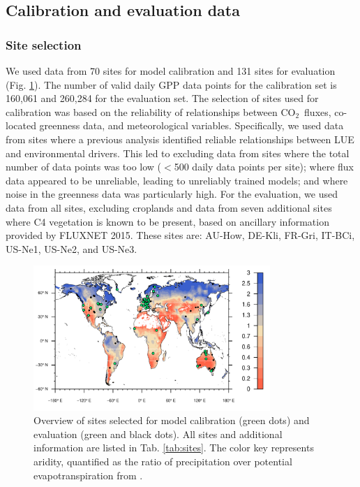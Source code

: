 \documentclass{myreport}
\newcommand{\coo}{CO$_2$}
\begin{document}
\subsection{Calibration and evaluation data}

\label{sec:calibdata}

\subsubsection{Site selection}
We used data from 70 sites for model calibration and 131 sites for evaluation (Fig. \ref{fig:map_sites}). The number of valid daily GPP data points for the calibration set is 160,061 and 260,284 for the evaluation set. The selection of sites used for calibration was based on the reliability of relationships between \coo\ fluxes, co-located greenness data, and meteorological variables. Specifically, we used data from sites where a previous analysis \citep{stocker18newphyt} identified reliable relationships between LUE and environmental drivers. This led to excluding data from sites where the total number of data points was too low ($<$500 daily data points per site); where flux data appeared to be unreliable, leading to unreliably trained models; and where noise in the greenness data was particularly high. For the evaluation, we used data from all sites, excluding croplands and data from seven additional sites where C4 vegetation is known to be present, based on ancillary information provided by FLUXNET 2015. These sites are: AU-How, DE-Kli, FR-Gri, IT-BCi, US-Ne1, US-Ne2, and US-Ne3.

\begin{figure}[!ht]
    \centering
    \includegraphics[width=0.8\textwidth]{fig/map_sites.pdf}
    \caption{Overview of sites selected for model calibration (green dots) and evaluation (green and black dots). All sites and additional information are listed in Tab. \ref{tab:sites}. The color key represents aridity, quantified as the ratio of precipitation over potential evapotranspiration from \cite{greve14}.}
    \label{fig:map_sites}
\end{figure}
\end{document}
